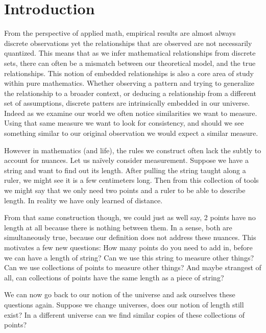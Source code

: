 \chapter{Introduction}

From the perspective of applied math, empirical results are almost always discrete observations yet the relationships that are observed are not necessarily quantized.  This means that as we infer mathematical relationships from discrete sets, there can often be a mismatch between our theoretical model, and the true relationships.  This notion of embedded relationships is also a core area of study within pure mathematics.  Whether observing a pattern and trying to generalize the relationship to a broader context, or deducing a relationship from a different set of assumptions, discrete patters are intrinsically embedded in our universe.  Indeed as we examine our world we often notice similarities we want to measure.  Using that same measure we want to look for consistency, and should we see something similar to our original observation we would expect a similar measure.  

However in mathematics (and life), the rules we construct often lack the subtly to account for nuances. Let us na\"{i}vely consider measurement.  Suppose we have a string and want to find out its length.  After pulling the string taught along a ruler, we might see it is a few centimeters long.  Then from this collection of tools we might say that we only need two points and a ruler to be able to describe length.  In reality we have only learned of distance.  

From that same construction though, we could just as well say, 2 points have no length at all because there is nothing between them.  In a sense, both are simultaneously true, because our definition does not address these nuances.  This motivates a few new questions: How many points do you need to add in, before we can have a length of string?  Can we use this string to measure other things?  Can we use collections of points to measure other things?  And maybe strangest of all, can collections of points have the same length as a piece of string?

We can now go back to our notion of the universe and ask ourselves these questions again.  Suppose we change universes, does our notion of length still exist? In a different universe can we find similar copies of these collections of points? 

